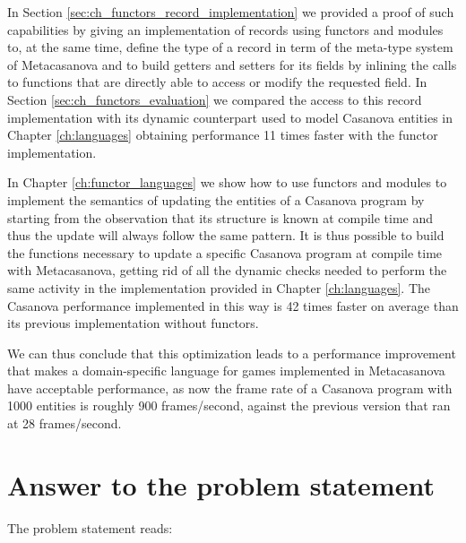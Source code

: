 In Section \ref{sec:ch_functors_record_implementation} we provided a proof of such capabilities by giving an implementation of records using functors and modules to, at the same time, define the type of a record in term of the meta-type system of Metacasanova and to build getters and setters for its fields by inlining the calls to functions that are directly able to access or modify the requested field. In Section \ref{sec:ch_functors_evaluation} we compared the access to this record implementation with its dynamic counterpart used to model Casanova entities in Chapter \ref{ch:languages} obtaining performance 11 times faster with the functor implementation.

In Chapter \ref{ch:functor_languages} we show how to use functors and modules to implement the semantics of updating the entities of a Casanova program by starting from the observation that its structure is known at compile time and thus the update will always follow the same pattern. It is thus possible to build the functions necessary to update a specific Casanova program at compile time with Metacasanova, getting rid of all the dynamic checks needed to perform the same activity in the implementation provided in Chapter \ref{ch:languages}. The Casanova performance implemented in this way is 42 times faster on average than its previous implementation without functors.

We can thus conclude that this optimization leads to a performance improvement that makes a domain-specific language for games implemented in Metacasanova have acceptable performance, as now the frame rate of a Casanova program with 1000 entities is roughly 900 frames/second, against the previous version that ran at 28 frames/second.

\section{Answer to the problem statement}
\label{subsec:ch_conclusion_problem_statement}
The problem statement reads:\\\\
\problemStatement{\psContent}\\\\

